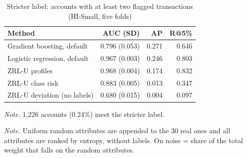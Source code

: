 \begin{table}[t]
\caption{Stricter label: accounts with at least two flagged transactions (HI-Small, five folds)}
\label{tab:strict}
\centering
\footnotesize
\begin{tabular}{@{}lrrr@{}}
\toprule
Method & AUC (SD) & AP & R@5\% \\
\midrule
Gradient boosting, default & 0.796 (0.053) & 0.271 & 0.646 \\
Logistic regression, default & 0.967 (0.003) & 0.246 & 0.803 \\
ZRL-U profiles & 0.968 (0.004) & 0.174 & 0.832 \\
ZRL-U class risk & 0.883 (0.005) & 0.013 & 0.347 \\
ZRL-U deviation (no labels) & 0.680 (0.015) & 0.004 & 0.097 \\
\bottomrule
\end{tabular}
\par\vspace{3pt}\parbox{0.98\columnwidth}{\footnotesize \emph{Note.} 1,226 accounts (0.24\%) meet the stricter label.}
\end{table}

\begin{table}[t]
\caption{Weight laws when pure-noise attributes are added (HI-Small sample of 100,000 accounts, label-free ranking, five folds)}
\label{tab:noise}
\centering
\footnotesize
{}
\par\vspace{3pt}\parbox{0.98\columnwidth}{\footnotesize \emph{Note.} Uniform random attributes are appended to the 30 real ones and all attributes are ranked by entropy, without labels. On noise = share of the total weight that falls on the random attributes.}
\end{table}

